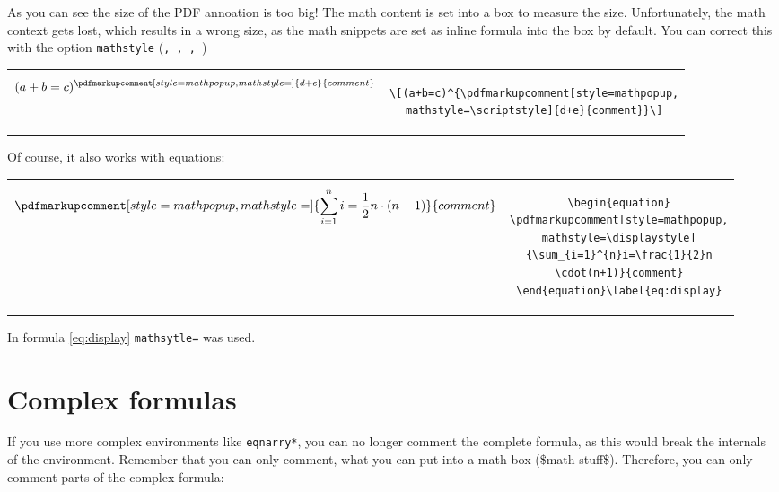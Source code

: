 \documentclass[pagesize,11pt,leqno]{scrartcl}
\begin{document}
\bigskip
As you can see the size of the PDF annoation is too big! The math content is set into a box to measure the size. Unfortunately, the math context gets lost, which results in a wrong size, as the math snippets are set as inline formula into the box by default. You can correct this with the option \texttt{mathstyle} (\texttt{\string\textstyle, \string\displaystyle, \string\scriptstyle, \string\scriptscriptstyle}) 

\bigskip
\begin{tabular}{cc}
\begin{minipage}{0.25\linewidth}
\[(a+b=c)^{\pdfmarkupcomment[style=mathpopup,mathstyle=\scriptstyle]{d+e}{comment}}\]
\end{minipage} &
\begin{minipage}{0.68\linewidth}
\begin{lstlisting}
\[(a+b=c)^{\pdfmarkupcomment[style=mathpopup,
mathstyle=\scriptstyle]{d+e}{comment}}\]
\end{lstlisting}
\end{minipage}
\end{tabular}

\bigskip
Of course, it also works with equations:

\bigskip
\begin{tabular}{cc}
\begin{minipage}{0.41\linewidth}
\begin{equation}
\pdfmarkupcomment[style=mathpopup,mathstyle=\displaystyle]{\sum_{i=1}^{n}i=\frac{1}{2}n\cdot(n+1)}{comment}
\end{equation}\label{eq:display}
\end{minipage} &
\begin{minipage}{0.52\linewidth}
\begin{lstlisting}
\begin{equation}
\pdfmarkupcomment[style=mathpopup,
mathstyle=\displaystyle]
{\sum_{i=1}^{n}i=\frac{1}{2}n
\cdot(n+1)}{comment}
\end{equation}\label{eq:display}
\end{lstlisting}
\end{minipage}
\end{tabular}

\bigskip
In formula \ref{eq:display} \texttt{mathsytle=\string\displaystyle} was used.

\section{Complex formulas}
If you use more complex environments like \texttt{eqnarry*}, you can no longer comment the complete formula, as this would break the internals of the environment. Remember that you can only comment, what you can put into a math box (\${}math stuff\${}). Therefore, you can only comment parts of the complex formula:
\end{document}
